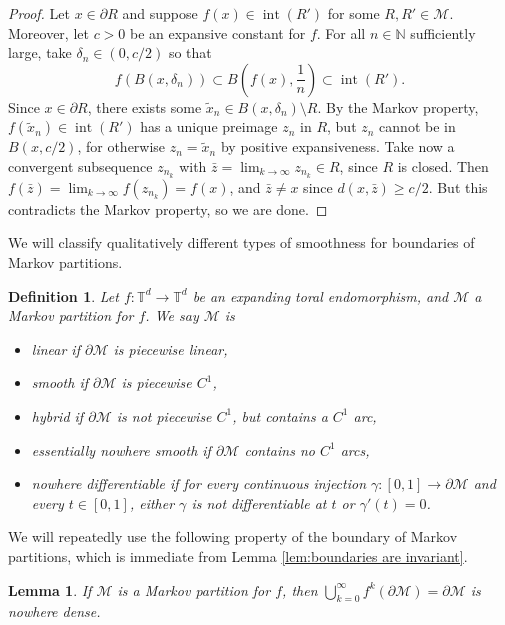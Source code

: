 \documentclass{article}
\def\N{\mathbb{N}}
\def\T{\mathbb{T}}
\def\M{\mathcal{M}}
\def\limk{\lim_{k\to\infty}}
\newtheorem{definition}[theorem]{Definition}
\newtheorem{lemma}[theorem]{Lemma}
\begin{document}
\begin{proof}
    Let $x\in \partial R$ and suppose $f(x)\in \operatorname{int}(R')$ for some $R,R'\in \M$. Moreover, let $c>0$ be an expansive constant for $f$. For all $n\in \N$ sufficiently large, take $\delta_n\in(0,c/2)$ so that $$f(B(x,\delta_n))\subset B\left(f(x),\frac{1}{n}\right) \subset \operatorname{int}(R').$$
    Since $x\in \partial R$, there exists some $\tilde{x}_n\in B(x,\delta_n)\setminus R$. By the Markov property, $f(\tilde{x}_n)\in \operatorname{int}(R')$ has a unique preimage $z_n$ in $R$, but $z_n$ cannot be in $B(x,c/2)$, for otherwise $z_n=\tilde{x}_n$ by positive expansiveness. Take now a convergent subsequence $z_{n_k}$ with $\bar{z}=\limk z_{n_k}\in R$, since $R$ is closed. Then $f(\bar{z})=\limk f(z_{n_k}) = f(x)$, and $\bar{z}\neq x$ since $d(x,\bar{z})\geq c/2$. But this contradicts the Markov property, so we are done. 
\end{proof}

We will classify qualitatively different types of smoothness for boundaries of Markov partitions.

\begin{definition}\label{def:smoothness MP}
    Let $f:\T^d\to \T^d$ be an expanding toral endomorphism, and $\M$ a Markov partition for $f$. We say $\M$ is \begin{itemize}
    \item \textit{linear} if $\partial\M$ is piecewise linear,
    \item \textit{smooth} if $\partial\M$ is piecewise $C^1$, 
    \item \textit{hybrid} if $\partial\M$ is not piecewise $C^1$, but contains a $C^1$ arc,
    \item \textit{essentially nowhere smooth} if $\partial\M$ contains no $C^1$ arcs, 
    \item \textit{nowhere differentiable} if for every continuous injection $\gamma:[0,1]\to\partial\M$ and every $t\in[0,1]$, either $\gamma$ is not differentiable at $t$ or $\gamma'(t)=0$. 
\end{itemize}
\end{definition}


We will repeatedly use the following property of the boundary of Markov partitions, which is immediate from Lemma \ref{lem:boundaries are invariant}.
\begin{lemma}\label{lem:boundary not dense}
    If $\M$ is a Markov partition for $f$, then $\bigcup_{k=0}^\infty f^k(\partial\M) = \partial \M$ is nowhere dense.
\end{lemma}
\end{document}
